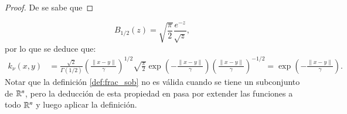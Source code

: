 \begin{proof}
    De \cite{Barton1965HandbookTables., Davis1944AFunctions} se sabe que
\end{proof}
    \[
B_{1/2} (z) = \sqrt{ \frac{\pi}{2} } \frac{e^{-z}}{\sqrt{z}},
\]
por lo que se deduce que:
\[
\begin{aligned}
k_\nu (x,y) &= \frac{\sqrt{2}}{\Gamma(1/2)} \left(  \frac{\|x-y\|}{\gamma} \right)^{1/2} \sqrt{ \frac{\pi}{2} } \exp \left( -\frac{\|x-y\|}{\gamma} \right) \left(  \frac{\|x-y\|}{\gamma} \right)^{-1/2} = \exp \left( -\frac{\|x-y\|}{\gamma} \right).
\end{aligned}
\]
Notar que la definición \ref{def:frac_sob} no es válida cuando se tiene un subconjunto de $\mathbb{R}^n$, pero la deducción de esta propiedad en \cite{Wendland2004ScatteredApproximation} pasa por extender las funciones a todo $\mathbb{R}^n$ y luego aplicar la definición. 

